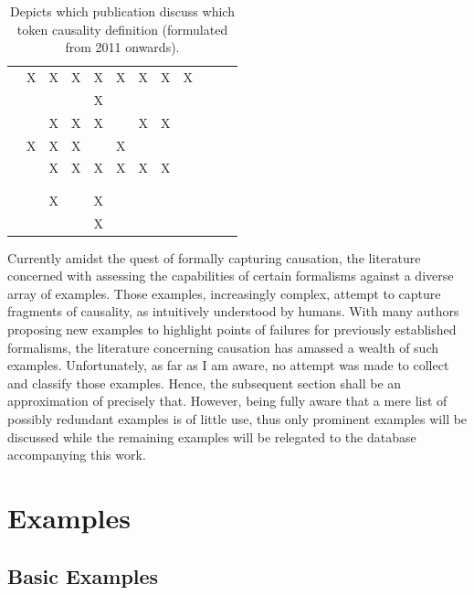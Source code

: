 \documentclass[11pt,a4paper]{book}
\theoremstyle{definition}
\theoremstyle{definition}
\theoremstyle{definition}
\theoremstyle{remark}
\begin{document}
\begin{table}
\begin{tabular}{lp{1.25cm}p{1.25cm}p{1.25cm}p{1.15cm}p{1.25cm}p{1.25cm}p{1.25cm}p{1.25cm}p{1.25cm}p{1.25cm}p{1.25cm}}
 \cite{beckers2018principled} 	& X	& X	& X	& X	& X	& X	& X	& X	 \\ 
 \cite{bochman2018laws}  	& 	& 	& 	& X	& 	& 	& 	& 	 \\ 
 \cite{denecker2018causal}  	& 	& X	& X	& X	& 	& X	& X	& 	 \\ 
 \cite{batusov2018situation}  	& X	& X	& X	& 	& X	& 	& 	& 	 \\ 
 \cite{denecker2019explaining}  	& 	& X	& X	& X	& X	& X	& X	& 	 \\ 
 \cite{liepicna2019evaluation}  	& 	& 	& 	& 	& 	& 	& 	& 	 \\ 
 \cite{leblanc2019explaining} 	& 	& 	& 	& 	& 	& 	& 	& 	 \\ 
 \cite{liepicna2020arguing} 	& 	& X	& 	& X	& 	& 	& 	& 	 \\ 
 \cite{khannecessary}  	& 	& 	& 	& X	& 	& 	& 	& 	 \\ 
	 	 	 	 	 	 	 	 	


\bottomrule
\end{tabular}
\caption{Depicts which publication discuss which token causality definition (formulated from 2011 onwards).  }
\label{tab:examples}
\end{table}




Currently amidst the quest of formally capturing causation, the literature concerned with assessing the capabilities of certain formalisms against a diverse array of examples.
Those examples, increasingly complex, attempt to capture fragments of causality, as intuitively understood by humans. With many authors proposing new examples to highlight points of failures for previously established formalisms, the literature concerning causation has amassed a wealth of such examples. Unfortunately, as far as I am aware, no attempt was made to collect and classify those examples. Hence, the subsequent section shall be an approximation of precisely that. However, being fully aware that a mere list of possibly redundant examples is of little use, thus only prominent examples will be discussed while the remaining examples will be relegated to the database accompanying this work.


\section{Examples}
\subsection{Basic Examples}
\end{document}
